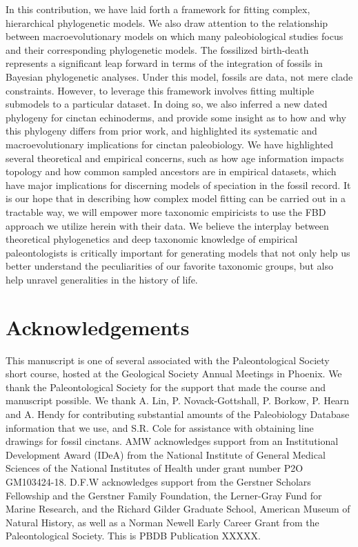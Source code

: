 \documentclass{article}
\begin{document}
In this contribution, we have laid forth a framework for fitting complex, hierarchical phylogenetic models. We also draw attention to the relationship between macroevolutionary models on which many paleobiological studies focus and their corresponding phylogenetic models. 
The fossilized birth-death represents a significant leap forward in terms of the integration of fossils in Bayesian phylogenetic analyses. 
Under this model, fossils are data, not mere clade constraints.
However, to leverage this framework involves fitting multiple submodels to a particular dataset.
In doing so, we also inferred a new dated phylogeny for cinctan echinoderms, and provide some insight as to how and why this phylogeny differs from prior work, and highlighted its systematic and macroevolutionary implications for cinctan paleobiology.
We have highlighted several theoretical and empirical concerns, such as how age information impacts topology and how common sampled ancestors are in empirical datasets, which have major implications for discerning models of speciation in the fossil record.
It is our hope that in describing how complex model fitting can be carried out in a tractable way, we will empower more taxonomic empiricists to use the FBD approach we utilize herein with their data.
We believe the interplay between theoretical phylogenetics and deep taxonomic knowledge of empirical paleontologists is critically important for generating models that not only help us better understand the peculiarities of our favorite taxonomic groups, but also help unravel generalities in the history of life.


\section{Acknowledgements}
This manuscript is one of several associated with the Paleontological Society short course, hosted at the Geological Society Annual Meetings in Phoenix. We thank the Paleontological Society for the support that made the course and manuscript possible.
We thank A. Lin, P. Novack-Gottshall, P. Borkow, P. Hearn and A. Hendy for contributing substantial amounts of the Paleobiology Database information that we use, and S.R. Cole for assistance with obtaining line drawings for fossil cinctans. AMW acknowledges  support from an Institutional Development Award (IDeA) from the National Institute of General Medical Sciences of the National Institutes of Health under grant number P2O GM103424-18. D.F.W acknowledges support from the Gerstner Scholars Fellowship and the Gerstner Family Foundation, the Lerner-Gray Fund for Marine Research, and the Richard Gilder Graduate School, American Museum of Natural History, as well as a Norman Newell Early Career Grant from the Paleontological Society.  This is PBDB Publication  XXXXX.
\end{document}
